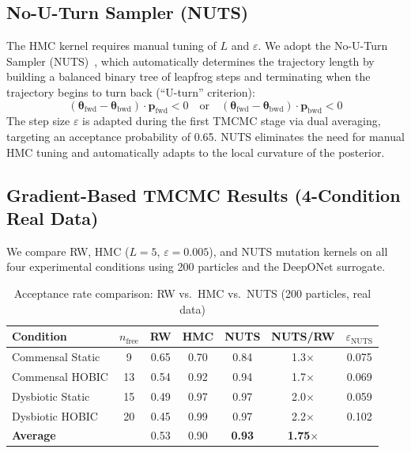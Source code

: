 \documentclass[11pt,a4paper]{article}
\begin{document}
\subsection{No-U-Turn Sampler (NUTS)}

The HMC kernel requires manual tuning of $L$ and $\varepsilon$. We adopt the No-U-Turn Sampler (NUTS)~\cite{HoffmanGelman2014NUTS}, which automatically determines the trajectory length by building a balanced binary tree of leapfrog steps and terminating when the trajectory begins to turn back (``U-turn'' criterion):
\begin{equation}
  (\boldsymbol{\theta}_\mathrm{fwd} - \boldsymbol{\theta}_\mathrm{bwd}) \cdot \mathbf{p}_\mathrm{fwd} < 0 \quad \text{or} \quad (\boldsymbol{\theta}_\mathrm{fwd} - \boldsymbol{\theta}_\mathrm{bwd}) \cdot \mathbf{p}_\mathrm{bwd} < 0
  \label{eq:uturn}
\end{equation}
The step size $\varepsilon$ is adapted during the first TMCMC stage via dual averaging, targeting an acceptance probability of 0.65. NUTS eliminates the need for manual HMC tuning and automatically adapts to the local curvature of the posterior.

\subsection{Gradient-Based TMCMC Results (4-Condition Real Data)}

We compare RW, HMC ($L=5$, $\varepsilon=0.005$), and NUTS mutation kernels on all four experimental conditions using 200 particles and the DeepONet surrogate.

\begin{table}[H]
\centering
\caption{Acceptance rate comparison: RW vs.\ HMC vs.\ NUTS (200 particles, real data)}
\label{tab:nuts_comparison}
\begin{tabular}{lcccccc}
\toprule
\textbf{Condition} & $n_\mathrm{free}$ & RW & HMC & NUTS & \textbf{NUTS/RW} & $\varepsilon_\mathrm{NUTS}$ \\
\midrule
Commensal Static  &  9 & 0.65 & 0.70 & 0.84 & 1.3$\times$ & 0.075 \\
Commensal HOBIC   & 13 & 0.54 & 0.92 & 0.94 & 1.7$\times$ & 0.069 \\
Dysbiotic Static  & 15 & 0.49 & 0.97 & 0.97 & 2.0$\times$ & 0.059 \\
Dysbiotic HOBIC   & 20 & 0.45 & 0.99 & 0.97 & 2.2$\times$ & 0.102 \\
\midrule
\textbf{Average}  &    & 0.53 & 0.90 & \textbf{0.93} & \textbf{1.75$\times$} & \\
\bottomrule
\end{tabular}
\end{table}
\end{document}
